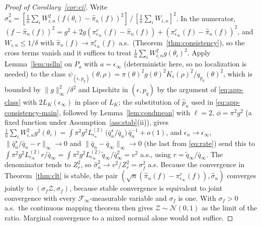 \documentclass[pdflatex,sn-mathphys-num]{sn-jnl}
\theoremstyle{plain}
\theoremstyle{definition}
\begin{document}
\begin{appendices}
\begin{proof}[Proof of Corollary~\ref{cor:ci}]
Write $\widehat\sigma^2_n=[\tfrac1n\sum_iW^2_{i,n}(f(\theta_i)-\widehat\pi_n(f))^2]\,/\,[\tfrac1n\sum_iW_{i,n}]^2$. In the numerator, $(f-\widehat\pi_n(f))^2=g^2+2g(\pi^r_{\epsilon_\infty}(f)-\widehat\pi_n(f))+(\pi^r_{\epsilon_\infty}(f)-\widehat\pi_n(f))^2$, and $W_{i,n}\le1/\delta$ with $\widehat\pi_n(f)\to\pi^r_{\epsilon_\infty}(f)$ a.s.\ (Theorem~\ref{thm:consistency}), so the cross terms vanish and it suffices to treat $\tfrac1n\sum_iW^2_{i,n}g(\theta_i)^2$. Apply Lemma~\ref{lem:uslln} on $P_{a}$ with $a=\epsilon_\infty$ (deterministic here, so no localization is needed) to the class $\psi_{(\epsilon,p_q)}(\theta,\rho)=\pi(\theta)^2g(\theta)^2K_\epsilon(\rho)^2/q_{p_q}(\theta)^2$, which is bounded by $\|g\|^2_\infty/\delta^2$ and Lipschitz in $(\epsilon,p_q)$ by the argument of \eqref{eq:app-class} with $2L_K(\epsilon_\infty)$ in place of $L_K$; the substitution of $\widehat p_n$ used in \eqref{eq:app-consistency-main}, followed by Lemma~\ref{lem:condmean} with $\ell=2$, $\phi=\pi^2g^2$ (a fixed function under Assumption~\ref{ass:stab}(ii)), gives
$\tfrac1n\sum_iW^2_{i,n}g^2(\theta_i)=\int\pi^2g^2L^{(2)}_{\epsilon_n}\,\bigl(\bar q^\star_n/\bar q_n\bigr)\,\bar q_n^{-1}+o(1)$,
and $\epsilon_n\to\epsilon_\infty$, $\|\bar q^\star_n/\bar q_n-r\|_\infty\to0$ and $\|\bar q_n-\bar q_\infty\|_\infty\to0$ (the last from \eqref{eq:rate}) send this to $\int\pi^2g^2L^{(2)}_{\epsilon_\infty}r/\bar q_\infty=\int\pi^2g^2L^{(2)}_{\epsilon_\infty}\tilde q_\infty/\bar q^2_\infty=v^2$ a.s., using $r=\tilde q_\infty/\bar q_\infty$. The denominator tends to $Z^2_r$, so $\widehat\sigma^2_n\to v^2/Z^2_r=\sigma^2_f$ a.s. Because the convergence in Theorem~\ref{thm:clt} is stable, the pair $(\sqrt n(\widehat\pi_n(f)-\pi^r_{\epsilon_\infty}(f)),\widehat\sigma_n)$ converges jointly to $(\sigma_f\mathcal{Z},\sigma_f)$, because stable convergence is equivalent to joint convergence with every $\mathcal{F}_\infty$-measurable variable and $\sigma_f$ is one. With $\sigma_f>0$ a.s.\ the continuous mapping theorem then gives $\mathcal{Z}\sim\mathcal{N}(0,1)$ as the limit of the ratio. Marginal convergence to a mixed normal alone would not suffice.
\end{proof}


\end{appendices}
\end{document}
